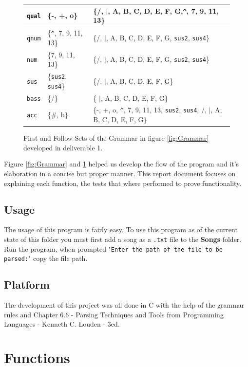 \documentclass{article}
\begin{document}
\begin{figure}[H]
\begin{tabularx}{\textwidth}{l|X|X}
        \hline
        \lstinline|qual| & \{-, +, o\} 
        & \{/, $\vert$, A, B, C, D, E, F, G,\lstinline|^|, 7, 9, 11, 13\} \\
        \hline
        \lstinline|qnum| & \{\lstinline|^|, 7, 9, 11, 13\}  & \{/, $\vert$, A, B, C, D, E, F, G, \texttt{sus2}, \texttt{sus4}\}  \\
        \hline
        \lstinline|num| & \{7, 9, 11, 13\} 
        & \{/, $\vert$, A, B, C, D, E, F, G, \texttt{sus2}, \texttt{sus4}\} \\
        \hline
        \lstinline|sus| & \{\texttt{sus2}, \texttt{sus4}\} 
        & \{/, $\vert$, A, B, C, D, E, F, G\}  \\
        \hline
        \lstinline|bass| & \{/\} 
        & \{ $\vert$, A, B, C, D, E, F, G\}\\
        \hline
        \lstinline|acc| & \{\#, b\} 
        & \{-, +, o, \lstinline|^|, 7, 9, 11, 13, \texttt{sus2}, \texttt{sus4}, /, $\vert$, A, B, C, D, E, F, G\} \\
        \hline
    \end{tabularx}
    \caption{First and Follow Sets of the Grammar in figure \ref*{fig:Grammar} developed in deliverable 1.}
    \label{fig:FirstAndFollowSets}
\end{figure}
Figure \ref*{fig:Grammar} and \ref*{fig:FirstAndFollowSets} helped us develop the flow of the program and it's elaboration in a concise but proper manner. This report document focuses on explaining each function, the tests that where performed to prove functionality.
\subsection{Usage}
The usage of this program is fairly easy. To use this program as of the current state of this folder you must first add a song as a \texttt{.txt} file to the \textbf{Songs} folder. Run the program, when prompted "\texttt{Enter the path of the file to be parsed:}" copy the file path.
\subsection{Platform}
The development of this project was all done in C with the help of the grammar rules and Chapter 6.6 - Parsing Techniques and Tools from Programming Languages - Kenneth C. Louden - 3ed.
\section{Functions}
\end{document}
